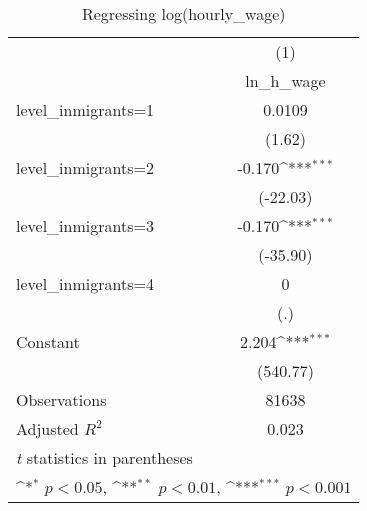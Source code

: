 \begin{table}[htbp]\centering
\def\sym#1{\ifmmode^{#1}\else\(^{#1}\)\fi}
\caption{Regressing log(hourly\_wage)}
\begin{tabular}{l*{1}{c}}
\hline\hline
                    &\multicolumn{1}{c}{(1)}\\
                    &\multicolumn{1}{c}{ln\_h\_wage}\\
\hline
level\_inmigrants=1  &      0.0109         \\
                    &      (1.62)         \\
[1em]
level\_inmigrants=2  &      -0.170\sym{***}\\
                    &    (-22.03)         \\
[1em]
level\_inmigrants=3  &      -0.170\sym{***}\\
                    &    (-35.90)         \\
[1em]
level\_inmigrants=4  &           0         \\
                    &         (.)         \\
[1em]
Constant            &       2.204\sym{***}\\
                    &    (540.77)         \\
\hline
Observations        &       81638         \\
Adjusted \(R^{2}\)  &       0.023         \\
\hline\hline
\multicolumn{2}{l}{\footnotesize \textit{t} statistics in parentheses}\\
\multicolumn{2}{l}{\footnotesize \sym{*} \(p<0.05\), \sym{**} \(p<0.01\), \sym{***} \(p<0.001\)}\\
\end{tabular}
\end{table}
